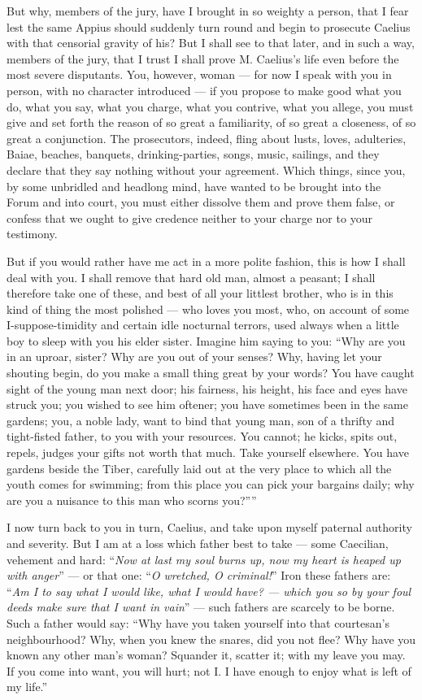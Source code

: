  But why, members of the jury, have I brought in so weighty a person, that I fear lest the same Appius should suddenly turn round and begin to prosecute Caelius with that censorial gravity of his? But I shall see to that later, and in such a way, members of the jury, that I trust I shall prove M. Caelius's life even before the most severe disputants. You, however, woman --- for now I speak with you in person, with no character introduced --- if you propose to make good what you do, what you say, what you charge, what you contrive, what you allege, you must give and set forth the reason of so great a familiarity, of so great a closeness, of so great a conjunction. The prosecutors, indeed, fling about lusts, loves, adulteries, Baiae, beaches, banquets, drinking-parties, songs, music, sailings, and they declare that they say nothing without your agreement. Which things, since you, by some unbridled and headlong mind, have wanted to be brought into the Forum and into court, you must either dissolve them and prove them false, or confess that we ought to give credence neither to your charge nor to your testimony.

 But if you would rather have me act in a more polite fashion, this is how I shall deal with you. I shall remove that hard old man, almost a peasant; I shall therefore take one of these, and best of all your littlest brother, who is in this kind of thing the most polished --- who loves you most, who, on account of some I-suppose-timidity and certain idle nocturnal terrors, used always when a little boy to sleep with you his elder sister. Imagine him saying to you: ``Why are you in an uproar, sister? Why are you out of your senses? Why, having let your shouting begin, do you make a small thing great by your words? You have caught sight of the young man next door; his fairness, his height, his face and eyes have struck you; you wished to see him oftener; you have sometimes been in the same gardens; you, a noble lady, want to bind that young man, son of a thrifty and tight-fisted father, to you with your resources. You cannot; he kicks, spits out, repels, judges your gifts not worth that much. Take yourself elsewhere. You have gardens beside the Tiber, carefully laid out at the very place to which all the youth comes for swimming; from this place you can pick your bargains daily; why are you a nuisance to this man who scorns you?''''

 I now turn back to you in turn, Caelius, and take upon myself paternal authority and severity. But I am at a loss which father best to take --- some Caecilian, vehement and hard: ``\textit{Now at last my soul burns up, now my heart is heaped up with anger}'' --- or that one: ``\textit{O wretched, O criminal!}'' Iron these fathers are: ``\textit{Am I to say what I would like, what I would have? --- which you so by your foul deeds make sure that I want in vain}'' --- such fathers are scarcely to be borne. Such a father would say: ``Why have you taken yourself into that courtesan's neighbourhood? Why, when you knew the snares, did you not flee? Why have you known any other man's woman? Squander it, scatter it; with my leave you may. If you come into want, you will hurt; not I. I have enough to enjoy what is left of my life.''

